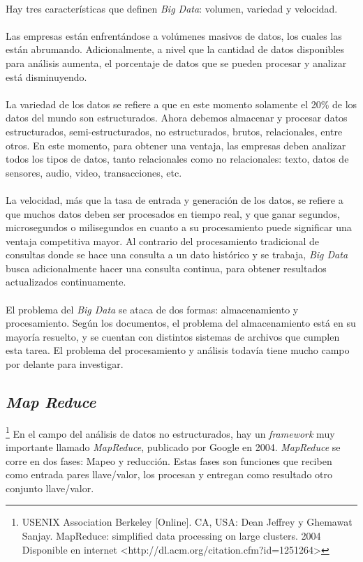 \paragraph{}
Hay tres caracter\'isticas que definen \textit{Big Data}: volumen, variedad y velocidad. 
\paragraph{}
Las empresas est\'an enfrent\'andose a vol\'umenes masivos de datos, los cuales las est\'an abrumando. Adicionalmente, a nivel que la cantidad de datos disponibles para an\'alisis aumenta, el porcentaje de datos que se pueden procesar y analizar est\'a disminuyendo.
\paragraph{}
La variedad de los datos se refiere a que en este momento solamente el 20\% de los datos del mundo son estructurados. Ahora debemos almacenar y procesar datos estructurados, semi-estructurados, no estructurados, brutos, relacionales, entre otros. En este momento, para obtener una ventaja, las empresas deben analizar todos los tipos de datos, tanto relacionales como no relacionales: texto, datos de sensores, audio, video, transacciones, etc.
\paragraph{}
La velocidad, m\'as que la tasa de entrada y generaci\'on de los datos, se refiere a que muchos datos deben ser procesados en tiempo real, y que ganar segundos, microsegundos o milisegundos en cuanto a su procesamiento puede significar una ventaja competitiva mayor. Al contrario del procesamiento tradicional de consultas donde se hace una consulta a un dato hist\'orico y se trabaja, \textit{Big Data} busca adicionalmente hacer una consulta continua, para obtener resultados actualizados continuamente.
\paragraph{}
El problema del \textit{Big Data} se ataca de dos formas: almacenamiento y procesamiento. Seg\'un los documentos, el problema del almacenamiento est\'a en su mayor\'ia resuelto, y se cuentan con distintos sistemas de archivos que cumplen esta tarea. El problema del procesamiento y an\'alisis todav\'ia tiene mucho campo por delante para investigar.
\subsection{\textit{Map Reduce}}\footnote{USENIX Association Berkeley [Online]. CA, USA:  Dean Jeffrey y  Ghemawat Sanjay. MapReduce: simplified data processing on large clusters. 2004 Disponible en internet \textless http://dl.acm.org/citation.cfm?id=1251264\textgreater}
En el campo del an\'alisis de datos no estructurados, hay un \textit{framework} muy importante llamado \textit{MapReduce}, publicado por Google en 2004. \textit{MapReduce} se corre en dos fases: Mapeo y reducci\'on. Estas fases son funciones que reciben como entrada pares llave/valor, los procesan y entregan como resultado otro conjunto llave/valor.
